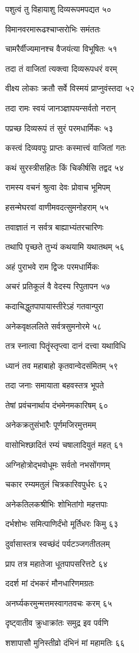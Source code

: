 पशुत्वं तु विहायाशु दिव्यरूपमपद्यत ५०

विमानवरमारूढश्चाप्सरोभिः समंततः

चामरैर्वीज्यमानश्च वैजयंत्या विभूषितः ५१

तदा तं वाजितां त्यक्त्वा दिव्यरूपधरं वरम्

वीक्ष्य लोकाः क्रतौ सर्वे विस्मयं प्राप्नुवंस्तदा ५२

तदा रामः स्वयं जानञ्ज्ञापयन्सर्वतो नरान्

पप्रच्छ दिव्यरूपं तं सुरं परमधार्मिकः ५३

कस्त्वं दिव्यवपुः प्राप्तः कस्मात्त्वं वाजितां गतः

कथं सुरस्त्रीसहितः किं चिकीर्षसि तद्वद ५४

रामस्य वचनं श्रुत्वा देवः प्रोवाच भूमिपम्

हसन्मेघरवां वाणीमवदत्सुमनोहराम् ५५

तवाज्ञातं न सर्वत्र बाह्याभ्यंतरचारिणः

तथापि पृच्छते तुभ्यं कथयामि यथातथम् ५६

अहं पुराभवे राम द्विजः परमधार्मिकः

अचरं प्रतिकूलं वै वेदस्य रिपुतापन ५७

कदाचिद्धुतपापायास्तीरेऽहं गतवान्पुरा

अनेकवृक्षललिते सर्वत्रसुमनोरमे ५८

तत्र स्नात्वा पितॄंस्तृप्त्वा दानं दत्त्वा यथाविधि

ध्यानं तव महाबाहो कृतवान्वेदसंमितम् ५९

तदा जनाः समायाता बहवस्तत्र भूपते

तेषां प्रवंचनार्थाय दंभमेनमकारिषम् ६०

अनेकक्रतुसंभारैः पूर्णमजिरमुत्तमम्

वासोभिश्छादितं रम्यं चषालादियुतं महत् ६१

अग्निहोत्रोद्भवोधूमः सर्वतो नभसोंगणम्

चकार रम्यमतुलं चित्रकारिवपुर्धरः ६२

अनेकतिलकश्रीभिः शोभितांगो महत्तपाः

दर्भशोभः समित्पाणिर्दंभो मूर्तिधरः किमु ६३

दुर्वासास्तत्र स्वच्छंदं पर्यटञ्जगतीतलम्

प्राप तत्र महातेजा धूतपापसरित्तटे ६४

ददर्श मां दंभकरं मौनधारिणमग्रतः

अनर्घ्यकरमुन्मत्तमस्वागतवचः करम् ६५

दृष्ट्वातीव क्रुधाक्रांतः समुद्र इव पर्वणि

शशापासौ मुनिस्तीव्रो दंभिनं मां महामतिः ६६

